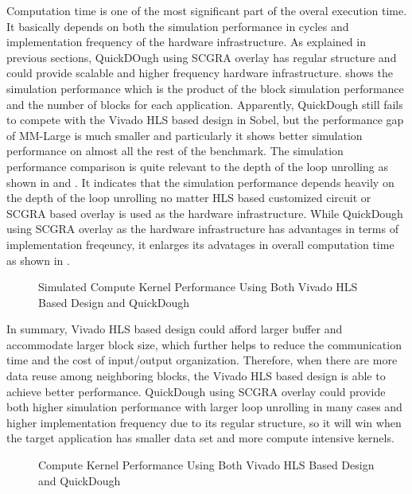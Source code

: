 Computation time is one of the most significant part of the overal execution time. It basically depends on both the simulation performance in cycles and implementation frequency of the hardware infrastructure. As explained in previous sections, QuickDOugh using SCGRA overlay has regular structure and could provide scalable and higher frequency hardware infrastructure.  shows the simulation performance which is the product of the block simulation performance and the number of blocks for each application. Apparently, QuickDough still fails to compete with the Vivado HLS based design in Sobel, but the performance gap of MM-Large is much smaller and particularly it shows better simulation performance on almost all the rest of the benchmark. The simulation performance comparison is quite relevant to the depth of the loop unrolling as shown in  and . It indicates that the simulation performance depends heavily on the depth of the loop unrolling no matter HLS based customized circuit or SCGRA based overlay is used as the hardware infrastructure. While QuickDough using SCGRA overlay as the hardware infrastructure has advantages in terms of implementation freqeuncy, it enlarges its advatages in overall computation time as shown in . 

\begin{figure}[H]
\caption{Simulated Compute Kernel Performance Using Both Vivado HLS Based Design and QuickDough}
\label{fig:kernel-sim-perf}
\end{figure}

In summary, Vivado HLS based design could afford larger buffer and accommodate larger block size, which further helps to reduce the communication time and the cost of input/output organization. Therefore, when there are more data reuse among neighboring blocks, the Vivado HLS based design is able to achieve better performance. QuickDough using SCGRA overlay could provide both higher simulation performance with larger loop unrolling in many cases and higher implementation frequency due to its regular structure, so it will win when the target application has smaller data set and more compute intensive kernels.  

\begin{figure}[H]
\caption{Compute Kernel Performance Using Both Vivado HLS Based Design and QuickDough}
\label{fig:kernel-real-perf}
\end{figure}
